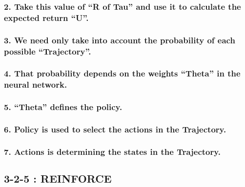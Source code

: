 \documentclass[11pt]{article}
\begin{document}
\hypertarget{take-this-value-of-r-of-tau-and-use-it-to-calculate-the-expected-return-u.}{%
\subsubsection{2. Take this value of ``R of Tau'' and use it to
calculate the expected return
``U''.}\label{take-this-value-of-r-of-tau-and-use-it-to-calculate-the-expected-return-u.}}

\hypertarget{we-need-only-take-into-account-the-probability-of-each-possible-trajectory.}{%
\subsubsection{3. We need only take into account the probability of each
possible
``Trajectory''.}\label{we-need-only-take-into-account-the-probability-of-each-possible-trajectory.}}

\hypertarget{that-probability-depends-on-the-weights-theta-in-the-neural-network.}{%
\subsubsection{4. That probability depends on the weights ``Theta'' in
the neural
network.}\label{that-probability-depends-on-the-weights-theta-in-the-neural-network.}}

\hypertarget{theta-defines-the-policy.}{%
\subsubsection{5. ``Theta'' defines the
policy.}\label{theta-defines-the-policy.}}

\hypertarget{policy-is-used-to-select-the-actions-in-the-trajectory.}{%
\subsubsection{6. Policy is used to select the actions in the
Trajectory.}\label{policy-is-used-to-select-the-actions-in-the-trajectory.}}

\hypertarget{actions-is-determining-the-states-in-the-trajectory.}{%
\subsubsection{7. Actions is determining the states in the
Trajectory.}\label{actions-is-determining-the-states-in-the-trajectory.}}

    \hypertarget{reinforce}{%
\subsection{3-2-5 : REINFORCE}\label{reinforce}}
\end{document}
